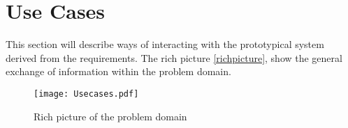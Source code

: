 \section{Use Cases}\label{sub:usecases}

This section will describe ways of interacting with the prototypical system derived from the requirements. The rich picture \cref{richpicture}, show the general exchange of information within the problem domain.

\begin{figure}
  \centering
  \begin{adjustbox}{max width=\textwidth}
    \texttt{[image: Usecases.pdf]}
  \end{adjustbox}
  \caption{Rich picture of the problem domain}
  \label{fig:richpicture}  
\end{figure}
